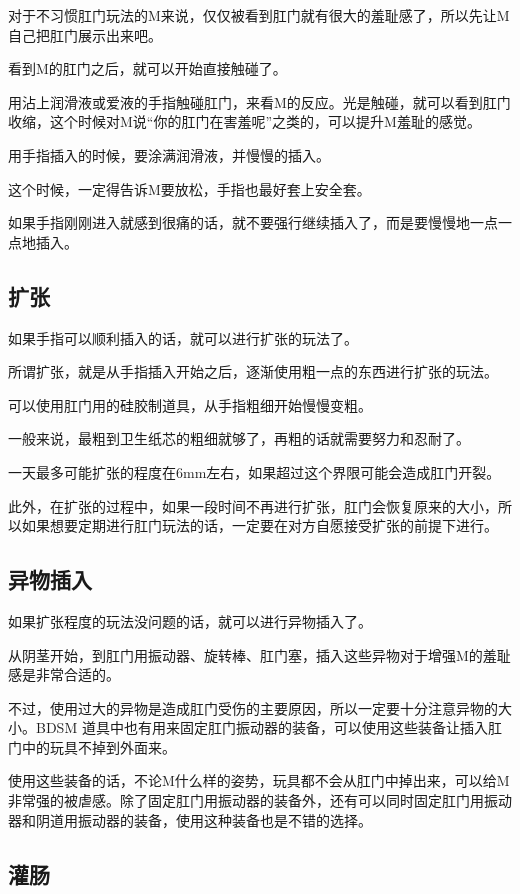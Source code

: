 \documentclass[12pt,UTF8]{ctexbook}
\begin{document}
对于不习惯肛门玩法的M来说，仅仅被看到肛门就有很大的羞耻感了，所以先让M自己把肛门展示出来吧。

看到M的肛门之后，就可以开始直接触碰了。

用沾上润滑液或爱液的手指触碰肛门，来看M的反应。光是触碰，就可以看到肛门收缩，这个时候对M说“你的肛门在害羞呢”之类的，可以提升M羞耻的感觉。

用手指插入的时候，要涂满润滑液，并慢慢的插入。

这个时候，一定得告诉M要放松，手指也最好套上安全套。

如果手指刚刚进入就感到很痛的话，就不要强行继续插入了，而是要慢慢地一点一点地插入。

\subsection{扩张}

如果手指可以顺利插入的话，就可以进行扩张的玩法了。

所谓扩张，就是从手指插入开始之后，逐渐使用粗一点的东西进行扩张的玩法。

可以使用肛门用的硅胶制道具，从手指粗细开始慢慢变粗。

一般来说，最粗到卫生纸芯的粗细就够了，再粗的话就需要努力和忍耐了。

一天最多可能扩张的程度在6mm左右，如果超过这个界限可能会造成肛门开裂。

此外，在扩张的过程中，如果一段时间不再进行扩张，肛门会恢复原来的大小，所以如果想要定期进行肛门玩法的话，一定要在对方自愿接受扩张的前提下进行。

\subsection{异物插入}

如果扩张程度的玩法没问题的话，就可以进行异物插入了。

从阴茎开始，到肛门用振动器、旋转棒、肛门塞，插入这些异物对于增强M的羞耻感是非常合适的。

不过，使用过大的异物是造成肛门受伤的主要原因，所以一定要十分注意异物的大小。BDSM 道具中也有用来固定肛门振动器的装备，可以使用这些装备让插入肛门中的玩具不掉到外面来。

使用这些装备的话，不论M什么样的姿势，玩具都不会从肛门中掉出来，可以给M非常强的被虐感。除了固定肛门用振动器的装备外，还有可以同时固定肛门用振动器和阴道用振动器的装备，使用这种装备也是不错的选择。

\subsection{灌肠}
\end{document}
